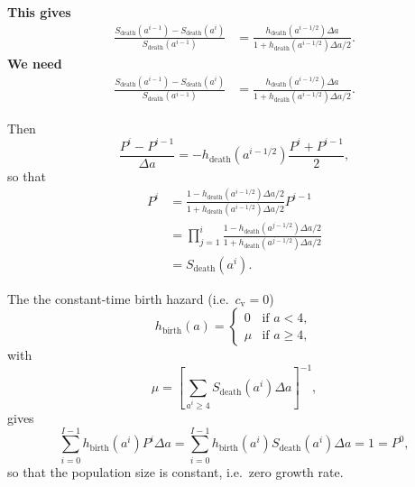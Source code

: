 \documentclass[12pt]{article}
\begin{document}
\textbf{This gives}
\begin{displaymath}
  \begin{split}
    \frac{
      S_{\text{death}}(a^{i - 1}) - S_{\text{death}}(a^i)
    }{
      S_{\text{death}}(a^{i - 1})
    }
    &= \frac{
      h_{\text{death}}(a^{i - 1 / 2}) \Delta a
    }{
      1 + h_{\text{death}}(a^{i - 1 / 2}) \Delta a / 2
    }.
  \end{split}
\end{displaymath}
\textbf{We need}
\begin{displaymath}
  \begin{split}
    \frac{
      S_{\text{death}}(a^{i - 1}) - S_{\text{death}}(a^i)
    }{
      S_{\text{death}}(a^{i - 1})
    }
    &= \frac{
      h_{\text{death}}(a^{i - 1 / 2}) \Delta a
    }{
      1 + h_{\text{death}}(a^{i - 1 / 2}) \Delta a / 2
    }.
  \end{split}
\end{displaymath}
%

Then
\begin{equation}
  \frac{P^i - P^{i - 1}}{\Delta a}
  = - h_{\text{death}}(a^{i - 1 / 2})
  \frac{P^i + P^{i - 1}}{2},
\end{equation}
so that
\begin{equation}
  \label{eq:discrete_total}
  \begin{split}
    P^i
    &= \frac{
      1 - h_{\text{death}}(a^{i - 1 / 2}) \Delta a / 2
    }{
      1 + h_{\text{death}}(a^{i - 1 / 2}) \Delta a / 2
    } P^{i - 1}
    \\
    &= \prod_{j = 1}^i \frac{
      1 - h_{\text{death}}(a^{j - 1 / 2}) \Delta a / 2
    }{
      1 + h_{\text{death}}(a^{j - 1 / 2}) \Delta a / 2
    }
    \\
    &= S_{\text{death}}(a^i).
  \end{split}
\end{equation}

The the constant-time birth hazard
(i.e.~$c_{\mathrm{v}} = 0$)
\begin{equation}
  h_{\text{birth}}(a) =
  \begin{cases}
    0 & \text{if $a < 4$}, \\
    \mu & \text{if $a \geq 4$},
  \end{cases}
\end{equation}
with
\begin{equation}
  \mu =
  \left[
    \sum_{a^i \geq 4}
    S_{\text{death}}(a^i)
    \Delta a
  \right]^{-1},
\end{equation}
gives
\begin{equation}
  \sum_{i = 0}^{I - 1}
  h_{\text{birth}}(a^i) P^i
  \Delta a
  = \sum_{i = 0}^{I - 1}
  h_{\text{birth}}(a^i) S_{\text{death}}(a^i)
  \Delta a
  = 1 = P^0,
\end{equation}
so that the population size is constant, i.e.~zero growth rate.




\end{document}
